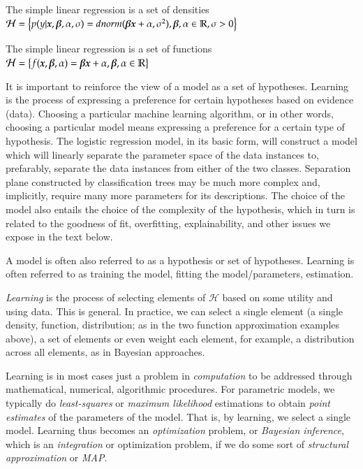 \begin{refsection}
\begin{example}
The simple linear regression is a set of densities \\
$\mathcal{H} =\left\lbrace p(y|\boldsymbol{x},\boldsymbol{\boldsymbol{\beta}},\alpha, \sigma)  = dnorm(\boldsymbol{\boldsymbol{\beta}}\boldsymbol{x} + \alpha, \sigma^2), \boldsymbol{\boldsymbol{\beta}}, \alpha \in \mathbb{R}, \sigma > 0 \right\rbrace$
\end{example}

\begin{example}
The simple linear regression is a set of functions
$\mathcal{H} =\left\lbrace f(\boldsymbol{x},\boldsymbol{\boldsymbol{\beta}},\alpha) = \boldsymbol{\boldsymbol{\beta}} \boldsymbol{x} + \alpha, \boldsymbol{\boldsymbol{\beta}}, \alpha \in \mathbb{R} \right\rbrace$
\end{example}

It is important to reinforce the view of a model as a set of hypotheses. Learning is the process of expressing a preference for certain hypotheses based on evidence (data). Choosing a particular machine learning algorithm, or in other words, choosing a particular model means expressing a preference for a certain type of hypothesis. The logistic regression model, in its basic form, will construct a model which will linearly separate the parameter space of the data instances to, prefarably, separate the data instances from either of the two classes. Separation plane constructed by classification trees may be much more complex and, implicitly, require many more parameters for its descriptions. The choice of the model also entails the choice of the complexity of the hypothesis, which in turn is related to the goodness of fit, overfitting, explainability, and other issues we expose in the text below.

A model is often also referred to as a hypothesis or set of hypotheses. Learning is often referred to as training the model, fitting the model/parameters, estimation.

{\em Learning} is the process of selecting elements of $\mathcal{H}$ based on some utility and using data. This is general. In practice, we can select a single element (a single density, function, distribution; as in the two function approximation examples above), a set of elements or even weight each element, for example, a distribution across all elements, as in Bayesian approaches.

Learning is in most cases just a problem in {\em computation} to be addressed through mathematical, numerical, algorithmic procedures. For parametric models, we typically do {\em least-squares} or {\em maximum likelihood} estimations to obtain {\em point estimates} of the parameters of the model. That is, by learning, we select a single model. Learning thus becomes an {\em optimization} problem, or {\em Bayesian inference}, which is an {\em integration} or optimization problem, if we do some sort of {\em structural approximation} or {\em MAP}. \



\end{refsection}
